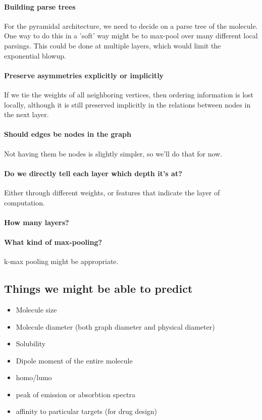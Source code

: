 \documentclass{article}
\begin{document}
\paragraph{Building parse trees}
For the pyramidal architecture, we need to decide on a parse tree of the molecule.
One way to do this in a 'soft' way might be to max-pool over many different local parsings.
This could be done at multiple layers, which would limit the exponential blowup.

\paragraph{Preserve asymmetries explicitly or implicitly}
If we tie the weights of all neighboring vertices, then ordering information is lost locally, although it is still preserved implicitly in the relations between nodes in the next layer.

\paragraph{Should edges be nodes in the graph}
Not having them be nodes is slightly simpler, so we'll do that for now.

\paragraph{Do we directly tell each layer which depth it's at?}  Either through different weights, or features that indicate the layer of computation.

\paragraph{How many layers?}

\paragraph{What kind of max-pooling?}
k-max pooling might be appropriate.

\subsection{Things we might be able to predict}

\begin{itemize}
\item Molecule size
\item Molecule diameter (both graph diameter and physical diameter)
\item Solubility
\item Dipole moment of the entire molecule
\item homo/lumo
\item peak of emission or absorbtion spectra
\item affinity to particular targets (for drug design)
\end{itemize}
\end{document}
